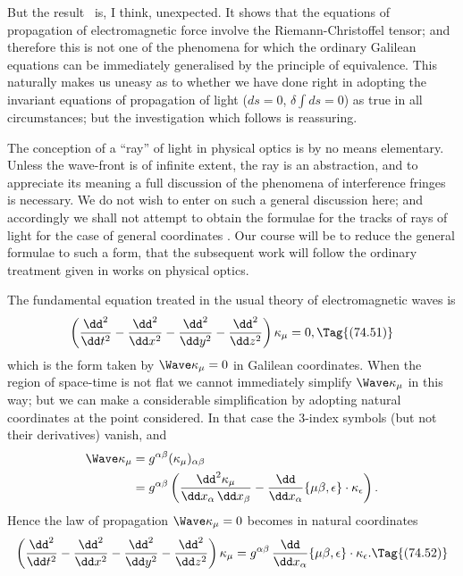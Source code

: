 \documentclass[12pt]{book}
\begin{document}
But the result~ is, I think, unexpected. It shows that the equations
of propagation of electromagnetic force involve the Riemann\hyp{}Christoffel tensor;
and therefore this is not one of the phenomena for which the ordinary Galilean
equations can be immediately generalised by the principle of equivalence.
This naturally makes us uneasy as to whether we have done right in adopting
the invariant equations of propagation of light ($ds = 0$, $\delta\int ds = 0$) as true in
all circumstances; but the investigation which follows is reassuring.


The conception of a ``ray'' of light in physical optics is by no means
elementary. Unless the wave-front is of infinite extent, the ray is an abstraction,
and to appreciate its meaning a full discussion of the phenomena of
interference fringes is necessary. We do not wish to enter on such a general
discussion here; and accordingly we shall not attempt to obtain the formulae
for the tracks of rays of light for the case of general coordinates .
Our course will be to reduce the general formulae to such a form, that the
subsequent work will follow the ordinary treatment given in works on physical
optics.

The fundamental equation treated in the usual theory of electromagnetic
waves is
\[
\left(\frac{\dd^{2}}{\dd t^{2}}
- \frac{\dd^{2}}{\dd x^{2}}
- \frac{\dd^{2}}{\dd y^{2}}
- \frac{\dd^{2}}{\dd z^{2}}\right) \kappa_{\mu} = 0,
\Tag{(74.51)}
\]
which is the form taken by $\Wave\kappa_{\mu} = 0$ in Galilean coordinates. When the region
of space-time is not flat we cannot immediately simplify $\Wave\kappa_{\mu}$ in this way;
but we can make a considerable simplification by adopting natural coordinates
at the point considered. In that case the $3$-index symbols (but not their
derivatives) vanish, and
\begin{align*}
  \Wave\kappa_{\mu} &= g^{\alpha\beta}(\kappa_{\mu})_{\alpha\beta} \\
  &= g^{\alpha\beta} \left(\frac{\dd^{2}\kappa_{\mu}}{\dd x_{\alpha}\, \dd x_{\beta}}
  - \frac{\dd}{\dd x_{\alpha}} \{\mu\beta, \epsilon\} \cdot \kappa_{\epsilon}\right).
\end{align*}
Hence the law of propagation $\Wave\kappa_{\mu} = 0$ becomes in natural coordinates
\[
\left(\frac{\dd^{2}}{\dd t^{2}}
- \frac{\dd^{2}}{\dd x^{2}}
- \frac{\dd^{2}}{\dd y^{2}}
- \frac{\dd^{2}}{\dd z^{2}}\right) \kappa_{\mu}
= g^{\alpha\beta}\, \frac{\dd}{\dd x_{\alpha}} \{\mu\beta, \epsilon\} \cdot \kappa_{\epsilon}.
\Tag{(74.52)}
\]
\end{document}
